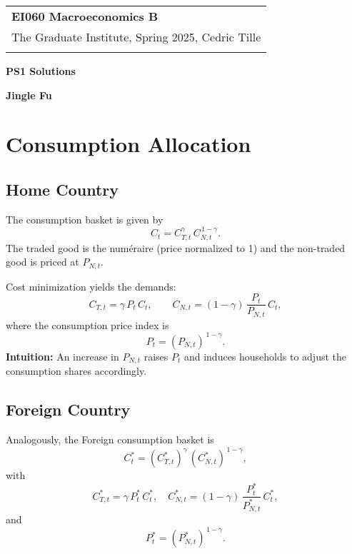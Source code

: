 \documentclass[a4paper,12pt]{article} %
\theoremstyle{nonitalic}
\begin{document}
\thispagestyle{empty} %

\begin{tabular}{p{15.5cm}} %
{\large \bf EI060 Macroeconomics B} \\
The Graduate Institute, Spring 2025, Cedric Tille\\
\hline %
\\
\end{tabular} %

\vspace*{0.3cm} %

\begin{center} %
	{\Large \bf PS1 Solutions} %
	\vspace{2mm}
	
	{\bf Jingle Fu} %
		
\end{center}  

\vspace{0.4cm}

\section{Consumption Allocation}

\subsection*{Home Country}
The consumption basket is given by
\[
C_t = C_{T,t}^{\gamma}\,C_{N,t}^{\,1-\gamma}.
\]
The traded good is the num\'eraire (price normalized to 1) and the non-traded good is priced at \( P_{N,t} \).

Cost minimization yields the demands:
\[
C_{T,t} = \gamma\,P_t\,C_t, \qquad C_{N,t} = (1-\gamma)\,\frac{P_t}{P_{N,t}}\,C_t,
\]
where the consumption price index is
\[
P_t = (P_{N,t})^{\,1-\gamma}.
\]
\textbf{Intuition:} An increase in \( P_{N,t} \) raises \( P_t \) and induces households to adjust the consumption shares accordingly.

\subsection*{Foreign Country}
Analogously, the Foreign consumption basket is
\[
C^*_t = (C^*_{T,t})^{\gamma}\,(C^*_{N,t})^{\,1-\gamma},
\]
with
\[
C^*_{T,t} = \gamma\,P^*_t\,C^*_t, \quad C^*_{N,t} = (1-\gamma)\,\frac{P^*_t}{P^*_{N,t}}\,C^*_t,
\]
and
\[
P^*_t = (P^*_{N,t})^{\,1-\gamma}.
\]
\end{document}

